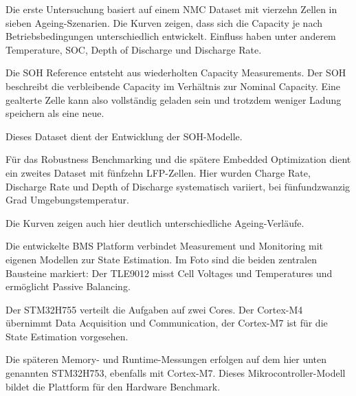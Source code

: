 \begin{sprechtext}

Die erste Untersuchung basiert auf einem NMC Dataset mit vierzehn Zellen in sieben Ageing-Szenarien. Die Kurven zeigen, dass sich die Capacity je nach Betriebsbedingungen unterschiedlich entwickelt. Einfluss haben unter anderem Temperature, SOC, Depth of Discharge und Discharge Rate.

Die SOH Reference entsteht aus wiederholten Capacity Measurements. Der SOH beschreibt die verbleibende Capacity im Verhältnis zur Nominal Capacity. Eine gealterte Zelle kann also vollständig geladen sein und trotzdem weniger Ladung speichern als eine neue.

Dieses Dataset dient der Entwicklung der SOH-Modelle.

\end{sprechtext}


\begin{sprechtext}

Für das Robustness Benchmarking und die spätere Embedded Optimization dient ein zweites Dataset mit fünfzehn LFP-Zellen. Hier wurden Charge Rate, Discharge Rate und Depth of Discharge systematisch variiert, bei fünfundzwanzig Grad Umgebungstemperatur.

Die Kurven zeigen auch hier deutlich unterschiedliche Ageing-Verläufe.

\end{sprechtext}


\begin{sprechtext}

Die entwickelte BMS Platform verbindet Measurement und Monitoring mit eigenen Modellen zur State Estimation. Im Foto sind die beiden zentralen Bausteine markiert: Der TLE9012 misst Cell Voltages und Temperatures und ermöglicht Passive Balancing.

Der STM32H755 verteilt die Aufgaben auf zwei Cores. Der Cortex-M4 übernimmt Data Acquisition und Communication, der Cortex-M7 ist für die State Estimation vorgesehen.

Die späteren Memory- und Runtime-Messungen erfolgen auf dem hier unten genannten STM32H753, ebenfalls mit Cortex-M7. Dieses Mikrocontroller-Modell bildet die Plattform für den Hardware Benchmark.

\end{sprechtext}

